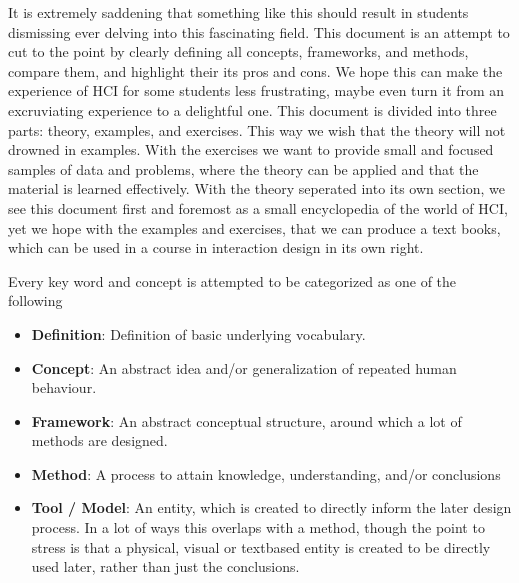 It is extremely saddening that something like this should result in students dismissing ever delving into this fascinating field. This document is an attempt to cut to the point by clearly defining all concepts, frameworks, and methods, compare them, and highlight their its pros and cons. We hope this can make the experience of HCI for some students less frustrating, maybe even turn it from an excruviating experience to a delightful one. This document is divided into three parts: theory, examples, and exercises. This way we wish that the theory will not drowned in examples. With the exercises we want to provide small and focused samples of data and problems, where the theory can be applied and that the material is learned effectively. With the theory seperated into its own section, we see this document first and foremost as a small encyclopedia of the world of HCI, yet we hope with the examples and exercises, that we can produce a text books, which can be used in a course in interaction design in its own right.

Every key word and concept is attempted to be categorized as one of the following
\begin{itemize}
   \item \textbf{Definition}: Definition of basic underlying vocabulary.

   \item \textbf{Concept}: An abstract idea and/or generalization of repeated human behaviour.

   \item \textbf{Framework}: An abstract conceptual structure, around which a lot of methods are designed.
  
   \item \textbf{Method}: A process to attain knowledge, understanding, and/or conclusions
  
   \item \textbf{Tool / Model}: An entity, which is created to directly inform the later design process. In a lot of ways this overlaps with a method, though the point to stress is that a physical, visual or textbased entity is created to be directly used later, rather than just the conclusions.
\end{itemize}
